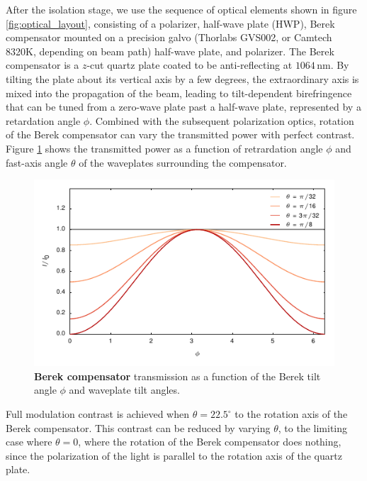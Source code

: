 \documentclass[twocolumn,aps,pra,showpacs,preprintnumbers,bibnotes]{revtex4-1}
\begin{document}
After the isolation stage, we use the sequence of optical elements shown in figure \ref{fig:optical_layout}, consisting of a polarizer, half-wave plate (HWP), Berek compensator mounted on a precision galvo (Thorlabs GVS002, or Camtech 8320K, depending on beam path) half-wave plate, and polarizer. 
The Berek compensator is a $z$-cut quartz plate coated to be anti-reflecting at $1064\,$nm. 
By tilting the plate about its vertical axis by a few degrees, the extraordinary axis is mixed into the propagation of the beam, leading to  tilt-dependent birefringence that can be tuned from a zero-wave plate past a half-wave plate, represented by a retardation angle $\phi$.
Combined with the subsequent polarization optics, rotation of the Berek compensator can vary the transmitted power with perfect contrast. 
Figure \ref{fig:berek} shows the transmitted power as a function of retrardation angle $\phi$ and fast-axis angle $\theta$ of the waveplates surrounding the compensator.
\begin{figure}
  \begin{center}
    \includegraphics{fig/berek_sim.pdf}
    \caption{\textbf{Berek compensator} transmission as a function of the Berek tilt angle $\phi$ and waveplate tilt angles.}\label{fig:berek}
  \end{center}
\end{figure}

Full modulation contrast is achieved when $\theta=22.5^\circ$ to the rotation axis of the Berek compensator.
This contrast can be reduced by varying $\theta$, to the limiting case where $\theta=0$, where the rotation of the Berek compensator does nothing, since the polarization of the light is parallel to the rotation axis of the quartz plate.
\end{document}
